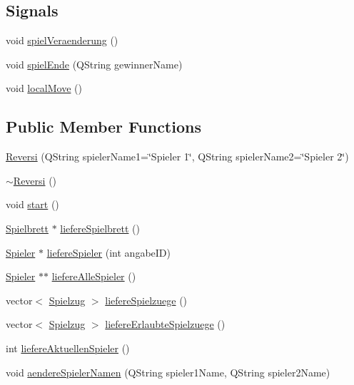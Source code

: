 \subsection*{Signals}
\begin{DoxyCompactItemize}
\item 
void \hyperlink{classReversi_a23b22c8f180004e0df26478219bd9b93}{spiel\-Veraenderung} ()
\item 
void \hyperlink{classReversi_a619606ac8e7e930a5701d6f44730771c}{spiel\-Ende} (Q\-String gewinner\-Name)
\item 
void \hyperlink{classReversi_ad4baa37d88dbe7b4ddd8791943137537}{local\-Move} ()
\end{DoxyCompactItemize}
\subsection*{Public Member Functions}
\begin{DoxyCompactItemize}
\item 
\hyperlink{classReversi_a3a9ba93d8fa9ca6eb84c6a80e3068fac}{Reversi} (Q\-String spieler\-Name1=\char`\"{}Spieler 1\char`\"{}, Q\-String spieler\-Name2=\char`\"{}Spieler 2\char`\"{})
\item 
\hyperlink{classReversi_afd006e4fdacdedc4a3bb34fe6f1d1940}{$\sim$\-Reversi} ()
\item 
void \hyperlink{classReversi_a9606774d86257a0eee737fdd19d396dc}{start} ()
\item 
\hyperlink{classSpielbrett}{Spielbrett} $\ast$ \hyperlink{classReversi_af2c9e7f784cdd40097fdb81debc69c0a}{liefere\-Spielbrett} ()
\item 
\hyperlink{classSpieler}{Spieler} $\ast$ \hyperlink{classReversi_ac34759e93dc42daeadc694c7f438161f}{liefere\-Spieler} (int angabe\-I\-D)
\item 
\hyperlink{classSpieler}{Spieler} $\ast$$\ast$ \hyperlink{classReversi_a3473c04b4663baa9b9731e9b9cd8c09f}{liefere\-Alle\-Spieler} ()
\item 
vector$<$ \hyperlink{classSpielzug}{Spielzug} $>$ \hyperlink{classReversi_a552ef8aea3cadce41ed8de8c610eb795}{liefere\-Spielzuege} ()
\item 
vector$<$ \hyperlink{classSpielzug}{Spielzug} $>$ \hyperlink{classReversi_a0e0285172b42340b0dc90837840f19c2}{liefere\-Erlaubte\-Spielzuege} ()
\item 
int \hyperlink{classReversi_a7ab1778f35a7335ab8522d81610e8d1f}{liefere\-Aktuellen\-Spieler} ()
\item 
void \hyperlink{classReversi_ad6befc3b432e95f5afb11e1cd8890225}{aendere\-Spieler\-Namen} (Q\-String spieler1\-Name, Q\-String spieler2\-Name)
\end{DoxyCompactItemize}


